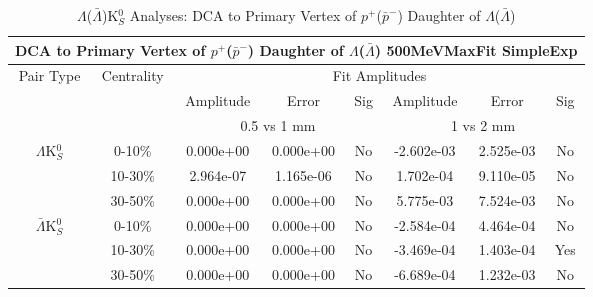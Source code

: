 \documentclass[../AnalysisNoteJBuxton.tex]{subfiles}
\begin{document}
\begin{table}
 \centering
 \begin{tabular}{|c|c|c|c|c||c|c|c|}
  \multicolumn{8}{c}{DCA to Primary Vertex of $p^{+}$($\bar{p}^{-}$) Daughter of $\Lambda$($\bar{\Lambda}$) 500MeVMaxFit SimpleExp} \\
  \hline
  \multirow{3}{*}{Pair Type} & \multirow{3}{*}{Centrality} & \multicolumn{6}{c|}{Fit Amplitudes} \\
  \cline{3-8}
   & & Amplitude & Error & Sig & Amplitude & Error & Sig \\  
  \cline{3-8}
   & & \multicolumn{3}{c||}{0.5 vs 1 mm} & \multicolumn{3}{c|}{1 vs 2 mm} \\  
  \hline  
  \multirow{3}{*}{$\Lambda$K$^{0}_{S}$}  
   &  0-10\% & 0.000e+00 & 0.000e+00 & No & -2.602e-03 & 2.525e-03 & No \\
   & 10-30\% & 2.964e-07 & 1.165e-06 & No & 1.702e-04 & 9.110e-05 & No \\
   & 30-50\% & 0.000e+00 & 0.000e+00 & No & 5.775e-03 & 7.524e-03 & No \\
  \hline  
  \multirow{3}{*}{$\bar{\Lambda}$K$^{0}_{S}$}  
   &  0-10\% & 0.000e+00 & 0.000e+00 & No & -2.584e-04 & 4.464e-04 & No \\
   & 10-30\% & 0.000e+00 & 0.000e+00 & No & -3.469e-04 & 1.403e-04 & Yes \\
   & 30-50\% & 0.000e+00 & 0.000e+00 & No & -6.689e-04 & 1.232e-03 & No \\
  \hline
 \end{tabular}
 \caption{$\Lambda$($\bar{\Lambda}$)K$^{0}_{S}$ Analyses: DCA to Primary Vertex of $p^{+}$($\bar{p}^{-}$) Daughter of $\Lambda$($\bar{\Lambda}$)}
 \label{tab:DcaToPrimVertexProtonDaughtOfLamLamK0_500MeVMaxFit_SimpleExp}
\end{table}



\end{document}
